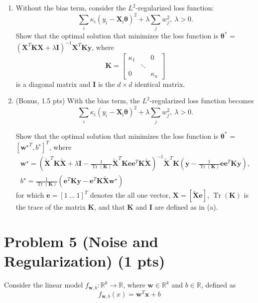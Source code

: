 \documentclass{article}
\DeclareMathOperator{\Tr}{Tr}
\def\matI{{\mathbf I}}
\def\matK{{\mathbf K}}
\begin{document}
\begin{enumerate}[label=(\alph*)]
\item Without the bias term, consider the $L^2$-regularized loss function:
$$\sum_i \kappa_i \left(y_i-\boldsymbol{X}_{\mathrm{i}} \boldsymbol{\theta}\right)^2+\lambda \sum_j w_j^2, \ \lambda > 0.$$
Show that the optimal solution that minimizes the loss function is $\boldsymbol{\theta^*}$ = $\left( \boldsymbol{X}^T \boldsymbol{K} \boldsymbol{X} + \lambda \boldsymbol{I}\right)^{-1} \boldsymbol{X}^T \boldsymbol{K} \boldsymbol{y}$, where
\begin{equation*}
  \boldsymbol{K} =
  \begin{bmatrix}
    \kappa_{1} & & 0\\
    & \ddots & \\
    0 & & \kappa_{n}
  \end{bmatrix}
\end{equation*}
%
is a diagonal matrix and $\boldsymbol{I}$ is the $d \times d$ identical matrix. 
%
\item (Bonus, 1.5 pts) With the bias term, the $L^2$-regularized loss function becomes
$$\sum_i \kappa_i \left(y_i-\boldsymbol{X}_{\mathrm{i}} \boldsymbol{\theta} \right)^2+\lambda \sum_j w_j^2, \ \lambda > 0.$$

Show that the optimal solution that minimizes the loss function is $\boldsymbol{\theta^*} $ =  $[ \boldsymbol{w^{\star}}^T, b^{\star}]^T$, where 
\begin{gather*}
\boldsymbol{w^{\star}}=\left( \boldsymbol{\tilde{X}}^T \boldsymbol{K} \boldsymbol{\tilde{X}} + \lambda \boldsymbol{I} - \frac{1}{\Tr{(\boldsymbol{K})}} \boldsymbol{\tilde{X}}^T \boldsymbol{K} \boldsymbol{e} \boldsymbol{e}^T \boldsymbol{K} \boldsymbol{\tilde{X}} \right)^{-1} \boldsymbol{\tilde{X}}^T \boldsymbol{K} \left( \boldsymbol{y} - \frac{1}{\Tr{(\boldsymbol{K})}} \boldsymbol{e} \boldsymbol{e}^T \boldsymbol{K} \boldsymbol{y} \right),\\
b^{\star} = \frac{1}{\Tr{(\boldsymbol{K})}} \left( \boldsymbol{e}^T \boldsymbol{K} \boldsymbol{y} - \boldsymbol{e}^T \boldsymbol{K} \boldsymbol{\tilde{X}} \boldsymbol{w^{\star}} \right)
\end{gather*}
%
for which $\boldsymbol{e}= [1 \ ... \ 1]^T$ denotes the all one vector, $\boldsymbol{X} = [\boldsymbol{\tilde{X}} \boldsymbol{e}] $, $\Tr{(\boldsymbol{K})}$ is the trace of the matrix $\boldsymbol{K}$, and that $\matK$ and $\matI$ are defined as in (a).
\end{enumerate}

\section*{Problem 5 (Noise and Regularization) (1 pts)}
Consider the linear model $f_{\mathbf{w},b}: \mathbb{R}^k \rightarrow \mathbb{R}$, where $\mathbf{w} \in \mathbb{R}^k$ and $b \in \mathbb{R}$, defined as
$$f_{\mathbf{w},b}(x) = \mathbf{w}^T \mathbf{x} + b$$
\end{document}
